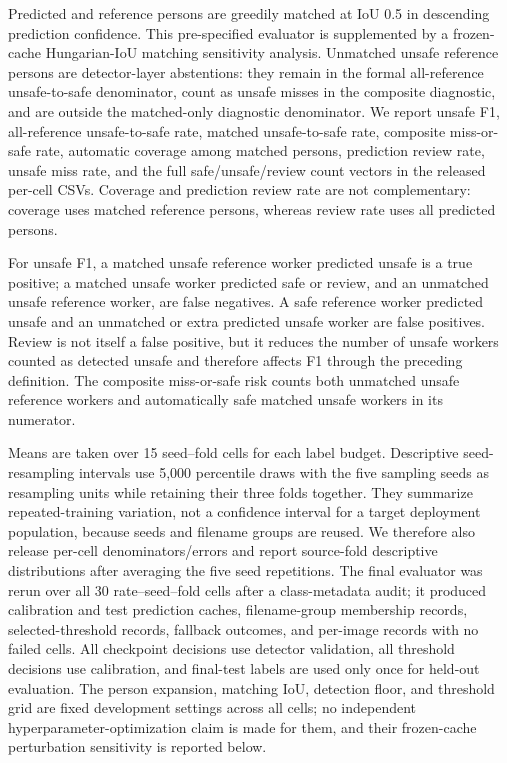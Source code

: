 \documentclass[iicol,pdflatex,sn-mathphys-num]{sn-jnl}
\begin{document}
Predicted and reference persons are greedily matched at IoU 0.5 in descending prediction confidence. This pre-specified evaluator is supplemented by a frozen-cache Hungarian-IoU matching sensitivity analysis. Unmatched unsafe reference persons are detector-layer abstentions: they remain in the formal all-reference unsafe-to-safe denominator, count as unsafe misses in the composite diagnostic, and are outside the matched-only diagnostic denominator. We report unsafe F1, all-reference unsafe-to-safe rate, matched unsafe-to-safe rate, composite miss-or-safe rate, automatic coverage among matched persons, prediction review rate, unsafe miss rate, and the full safe/unsafe/review count vectors in the released per-cell CSVs. Coverage and prediction review rate are not complementary: coverage uses matched reference persons, whereas review rate uses all predicted persons.

For unsafe F1, a matched unsafe reference worker predicted unsafe is a true positive; a matched unsafe worker predicted safe or review, and an unmatched unsafe reference worker, are false negatives. A safe reference worker predicted unsafe and an unmatched or extra predicted unsafe worker are false positives. Review is not itself a false positive, but it reduces the number of unsafe workers counted as detected unsafe and therefore affects F1 through the preceding definition. The composite miss-or-safe risk counts both unmatched unsafe reference workers and automatically safe matched unsafe workers in its numerator.

Means are taken over 15 seed--fold cells for each label budget. Descriptive seed-resampling intervals use 5,000 percentile draws with the five sampling seeds as resampling units while retaining their three folds together. They summarize repeated-training variation, not a confidence interval for a target deployment population, because seeds and filename groups are reused. We therefore also release per-cell denominators/errors and report source-fold descriptive distributions after averaging the five seed repetitions. The final evaluator was rerun over all 30 rate--seed--fold cells after a class-metadata audit; it produced calibration and test prediction caches, filename-group membership records, selected-threshold records, fallback outcomes, and per-image records with no failed cells. All checkpoint decisions use detector validation, all threshold decisions use calibration, and final-test labels are used only once for held-out evaluation. The person expansion, matching IoU, detection floor, and threshold grid are fixed development settings across all cells; no independent hyperparameter-optimization claim is made for them, and their frozen-cache perturbation sensitivity is reported below.
\end{document}
